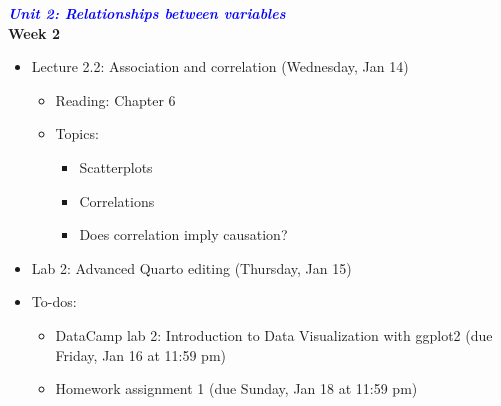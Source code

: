 \documentclass[11pt]{article}
\begin{document}
\newpage
\Large \textcolor{blue}{\textit{\textbf{Unit 2: Relationships between variables}}} \\

\large \textbf{Week 2}
\begin{itemize}
    \item Lecture 2.2: Association and correlation (Wednesday, Jan 14)
    \begin{itemize}
        \item Reading: Chapter 6
        \item Topics:
        \begin{itemize}
            \item Scatterplots
            \item Correlations
            \item Does correlation imply causation?
        \end{itemize}
    \end{itemize}
    \item Lab 2: Advanced Quarto editing (Thursday, Jan 15)
    \item To-dos:
    \begin{itemize}
        \item DataCamp lab 2: Introduction to Data Visualization with ggplot2 (due Friday, Jan 16 at 11:59 pm)
        \item Homework assignment 1 (due Sunday, Jan 18 at 11:59 pm)
    \end{itemize}
\end{itemize}
\end{document}
